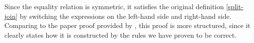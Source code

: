 \documentclass{l4proj}
\begin{document}
\begin{code}
\AgdaSymbol{))}\<%
\\
%
\>[2]\AgdaSpace{}%
\AgdaSpace{}%
\AgdaSpace{}%
\AgdaSymbol{(}\AgdaSpace{}%
\AgdaSpace{}%
\AgdaSymbol{\{}\AgdaSymbol{\}}\AgdaSpace{}%
\AgdaSpace{}%
\AgdaSymbol{)}\AgdaSpace{}%
\<%
\\
\>[2][@{}l@{\AgdaIndent{0}}]%
\>[4]\AgdaSpace{}%
\AgdaSymbol{(}\AgdaSpace{}%
\AgdaSpace{}%
\AgdaSymbol{\{}\AgdaSymbol{\}}\AgdaSpace{}%
\AgdaSymbol{(}\AgdaSpace{}%
\AgdaSpace{}%
\AgdaSymbol{))}\<%
\\
%
\>[2]\AgdaSpace{}%
\AgdaSpace{}%
\AgdaSpace{}%
\AgdaSymbol{\{}\AgdaSymbol{\}}\AgdaSpace{}%
\AgdaSymbol{(}\AgdaSpace{}%
\AgdaSpace{}%
\AgdaSymbol{)}\AgdaSpace{}%
\<%
\\
\>[2][@{}l@{\AgdaIndent{0}}]%
\>[4]\AgdaSpace{}%
\AgdaSpace{}%
\<%
\\
%
\>[2]\<%
\end{code}
Since the equality relation is symmetric, it satisfies the original definition \ref{split-join} by switching the expressions on the left-hand side and right-hand side. Comparing to the paper proof provided by \cite{steuwer2015improving}, this proof is more structured, since it clearly states how it is constructed by the rules we have proven to be correct.
\end{document}

